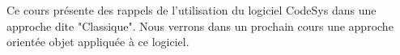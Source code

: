 Ce cours présente des rappels de l'utilisation du logiciel CodeSys dans une approche dite "Classique". Nous verrons dans un prochain cours une approche orientée objet appliquée à ce logiciel. 

